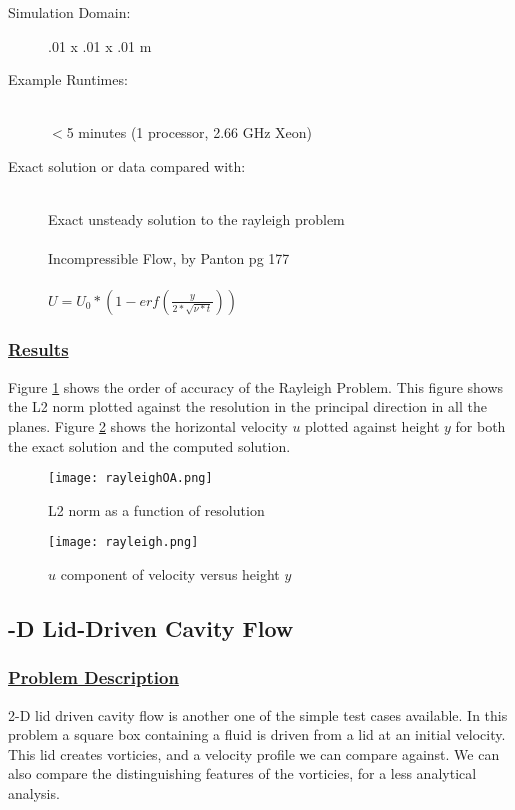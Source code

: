 \begin{description}
%
\item [Simulation Domain:]\hfill    .01 x .01 x .01 m
%
\item [Example Runtimes:] \hfill \\
 $<$5 minutes  (1 processor, 2.66 GHz Xeon)
%
\item [Exact solution or data compared with:] \hfill \\
Exact unsteady solution to the rayleigh problem \\ \\
Incompressible Flow, by Panton pg 177 \cite{ref:Panton} \\ \\
$U = U_0*(1-erf (\frac{y}{2*\sqrt{\nu*t}}))$
  
\end{description}
%
\subsubsection*{\underline{Results}} 
Figure \ref{fig:RayleighOA} shows the order of accuracy of the Rayleigh Problem. This figure shows the L2 norm plotted against the resolution in the principal direction in all the planes.  Figure \ref{fig:Rayleigh} shows the horizontal velocity $u$ plotted against height $y$ for both the exact solution and the computed solution. 
%
\begin{figure}[H]
  \centering
  \texttt{[image: rayleighOA.png]}
  \caption{L2 norm as a function of resolution}
  \label{fig:RayleighOA}
\end{figure}
% 
\begin{figure}[H]
  \centering
  \texttt{[image: rayleigh.png]}
  \caption{$u$ component of velocity versus height $y$}
  \label{fig:Rayleigh}
\end{figure} 
% 
\newpage
\subsection*{-D Lid-Driven Cavity Flow}
%
%
\subsubsection*{\underline{Problem Description}}
2-D lid driven cavity flow is another one of the simple test cases available. In this problem a square box containing a fluid is driven from a lid at an initial velocity. This lid creates vorticies, and a velocity profile we can compare against. We can also compare the distinguishing features of the vorticies, for a less analytical analysis.


